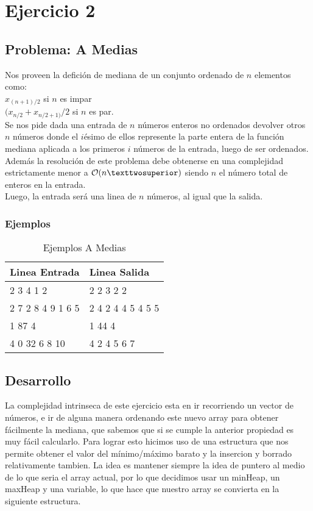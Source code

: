 \pagebreak
\section{Ejercicio 2}

\subsection{Problema: A Medias}
 Nos proveen la defici\'on de mediana de un conjunto ordenado de $n$ elementos como: \\
 $x_{(n+1)/2}$ si $n$ es impar \\
 $(x_{n/2} + x_{n/2+1)} /2$ si $n$ es par.\\
 
 Se nos pide dada una entrada de $n$ n\'umeros enteros no ordenados devolver otros $n$ n\'umeros donde el $i$\'esimo de ellos represente la parte entera de la funci\'on mediana aplicada a los primeros $i$ n\'umeros de la entrada, luego de ser ordenados. \\
 Adem\'as la resoluci\'on de este problema debe obtenerse en una complejidad estrictamente menor a $\bigO (n²)$ siendo $n$ el n\'umero total de enteros en la entrada.\\
 Luego, la entrada ser\'a una linea de $n$ n\'umeros, al igual que la salida.
\subsubsection{Ejemplos}


\begin{table}[htb]
\centering
\begin{tabular}{|l|l|}
\hline
Linea Entrada     & Linea Salida      \\ \hline
2 3 4 1 2         & 2 2 3 2 2         \\ \hline
2 7 2 8 4 9 1 6 5 & 2 4 2 4 4 5 4 5 5 \\ \hline
1 87 4            & 1 44 4            \\ \hline
4 0 32 6 8 10     & 4 2 4 5 6 7       \\ \hline
\end{tabular}
\caption{Ejemplos A Medias}
\label{my-label}
\end{table}

\subsection{Desarrollo} 
La complejidad intrinseca de este ejercicio esta en ir recorriendo un vector de n\'umeros, e ir de alguna manera ordenando este nuevo array para obtener f\'acilmente la mediana, que sabemos que si se cumple la anterior propiedad es muy f\'acil calcularlo. 
Para lograr esto hicimos uso de una estructura que nos permite obtener el valor del m\'inimo/m\'aximo barato y la insercion y borrado relativamente tambien.
La idea es mantener siempre la idea de puntero al medio de lo que seria el array actual, por lo que decidimos usar un minHeap, un maxHeap y una variable, lo que hace que nuestro array se convierta en la siguiente estructura. \\


